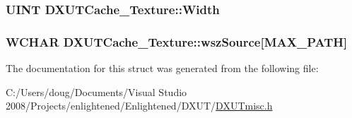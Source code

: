 \label{struct_d_x_u_t_cache___texture_a62b5039d2484ee1957f7742545e61afc}
\hypertarget{struct_d_x_u_t_cache___texture_a6d09b8c5fda282163eae7f42f9a3b0b9}{
\subsubsection[{Width}]{\setlength{\rightskip}{0pt plus 5cm}UINT {\bf DXUTCache\_\-Texture::Width}}}
\label{struct_d_x_u_t_cache___texture_a6d09b8c5fda282163eae7f42f9a3b0b9}
\hypertarget{struct_d_x_u_t_cache___texture_a2ef863de08edcc49d9b0c860a72105b7}{
\subsubsection[{wszSource}]{\setlength{\rightskip}{0pt plus 5cm}WCHAR {\bf DXUTCache\_\-Texture::wszSource}\mbox{[}MAX\_\-PATH\mbox{]}}}
\label{struct_d_x_u_t_cache___texture_a2ef863de08edcc49d9b0c860a72105b7}


The documentation for this struct was generated from the following file:\begin{DoxyCompactItemize}
\item 
C:/Users/doug/Documents/Visual Studio 2008/Projects/enlightened/Enlightened/DXUT/\hyperlink{_d_x_u_tmisc_8h}{DXUTmisc.h}\end{DoxyCompactItemize}
